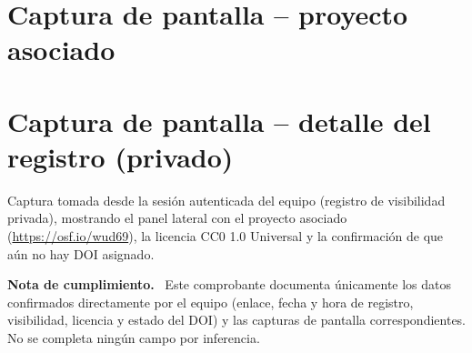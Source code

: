 \documentclass[11pt,a4paper]{article}
\newenvironment{notacumplimiento}
  {\begin{framed}\small\noindent\textbf{Nota de cumplimiento.}~}
  {\end{framed}}
\begin{document}
\section*{Captura de pantalla -- proyecto asociado}

\begin{figure}[H]
    \centering
\end{figure}

\section*{Captura de pantalla -- detalle del registro (privado)}

\begin{figure}[H]
    \centering
\end{figure}

\noindent
Captura tomada desde la sesión autenticada del equipo (registro de visibilidad
privada), mostrando el panel lateral con el proyecto asociado
(\url{https://osf.io/wud69}), la licencia CC0 1.0 Universal y la confirmación de que
aún no hay DOI asignado.

\vspace{1em}
\begin{notacumplimiento}
Este comprobante documenta únicamente los datos confirmados directamente por el
equipo (enlace, fecha y hora de registro, visibilidad, licencia y estado del DOI) y
las capturas de pantalla correspondientes. No se completa ningún campo por
inferencia.
\end{notacumplimiento}
\end{document}
